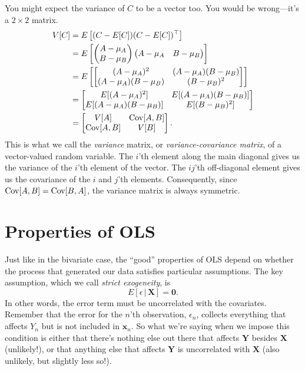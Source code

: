 \documentclass[
  12pt,
  oneside,openany]{book}
\begin{document}
You might expect the variance of \(C\) to be a vector too. You would be wrong---it's a \(2 \times 2\) matrix.
\[
\begin{aligned}
V[C]
&= E\left[(C - E[C]) (C - E[C])^\top \right] \\
&= E \left[
  \begin{pmatrix} A - \mu_A \\ B - \mu_B \end{pmatrix}
  \begin{pmatrix} A - \mu_A & B - \mu_B \end{pmatrix}
\right] \\
&= E \left[
  \begin{bmatrix}
  (A - \mu_A)^2 & (A - \mu_A) (B - \mu_B) \\
  (A - \mu_A) (B - \mu_B) & (B - \mu_B)^2
  \end{bmatrix}
\right] \\
&= \begin{bmatrix}
  E[(A - \mu_A)^2] & E[(A - \mu_A) (B - \mu_B)] \\
  E[(A - \mu_A) (B - \mu_B)] & E[(B - \mu_B)^2]
\end{bmatrix} \\
&= \begin{bmatrix}
  V[A] & \mathop{\rm Cov}\nolimits[A, B] \\
  \mathop{\rm Cov}\nolimits[A, B] & V[B]
\end{bmatrix}.
\end{aligned}
\]
This is what we call the \emph{variance} matrix, or \emph{variance-covariance matrix}, of a vector-valued random variable. The \(i\)'th element along the main diagonal gives us the variance of the \(i\)'th element of the vector. The \(ij\)'th off-diagonal element gives us the covariance of the \(i\) and \(j\)'th elements. Consequently, since \(\mathop{\rm Cov}\nolimits[A, B] = \mathop{\rm Cov}\nolimits[B, A]\), the variance matrix is always symmetric.

\hypertarget{properties-of-ols}{%
\section{Properties of OLS}\label{properties-of-ols}}

Just like in the bivariate case, the ``good'' properties of OLS depend on whether the process that generated our data satisfies particular assumptions. The key assumption, which we call \emph{strict exogeneity}, is
\[
E[\epsilon \,|\, \mathbf{X}] = \mathbf{0}.
\]
In other words, the error term must be uncorrelated with the covariates. Remember that the error for the \(n\)'th observation, \(\epsilon_n\), collects everything that affects \(Y_n\) but is not included in \(\mathbf{x}_n\). So what we're saying when we impose this condition is either that there's nothing else out there that affects \(\mathbf{Y}\) besides \(\mathbf{X}\) (unlikely!), or that anything else that affects \(\mathbf{Y}\) is uncorrelated with \(\mathbf{X}\) (also unlikely, but slightly less so!).
\end{document}
